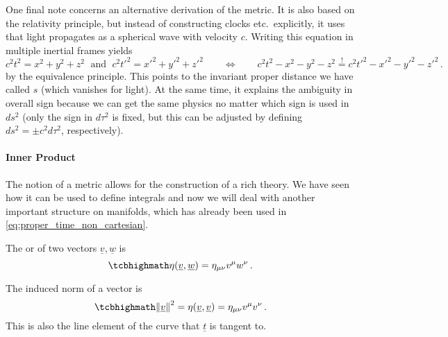 One final note concerns an alternative derivation of the metric. It is also based on the relativity principle, but instead of constructing clocks etc.~explicitly, it uses that light propagates as a spherical wave with velocity $c$. Writing this equation in multiple inertial frames yields
\begin{equation}
c^2 t^2 = x^2 + y^2 + z^2 \; \text{ and } \; c^2 t'^2 = x'^2 + y'^2 + z'^2 \qquad \Leftrightarrow \qquad c^2 t^2 - x^2 - y^2 - z^2 \overset{!}{=} c^2 t'^2 - x'^2 - y'^2 - z'^2 \, .
\end{equation}
by the equivalence principle. This points to the invariant proper distance we have called $s$ (which vanishes for light). At the same time, it explains the ambiguity in overall sign because we can get the same physics no matter which sign is used in $ds^2$ (only the sign in $d\tau^2$ is fixed, but this can be adjusted by defining $ds^2 = \pm c^2 d\tau^2$, respectively).



		\paragraph{Inner Product}
The notion of a metric allows for the construction of a rich theory. We have seen how it can be used to define integrals and now we will deal with another important structure on manifolds, which has already been used in \eqref{eq:proper_time_non_cartesian}.

\begin{defi}
The  or  of two vectors $\underline{v}, \underline{w}$ is
\begin{equation}\label{eq:inner_prod}
\eqbox{
\eta(\underline{v}, \underline{w}) = \eta_{\mu \nu} v^\mu w^\nu
} \, .
\end{equation}

The induced norm of a vector is
\begin{equation}\label{eq:vector_norm}
\eqbox{
\norm{\underline{v}}^2 = \eta(\underline{v}, \underline{v}) = \eta_{\mu \nu} v^\mu v^\nu
} \, .
\end{equation}
This is also the line element of the curve that $\underline{t}$ is tangent to.
\end{defi}


